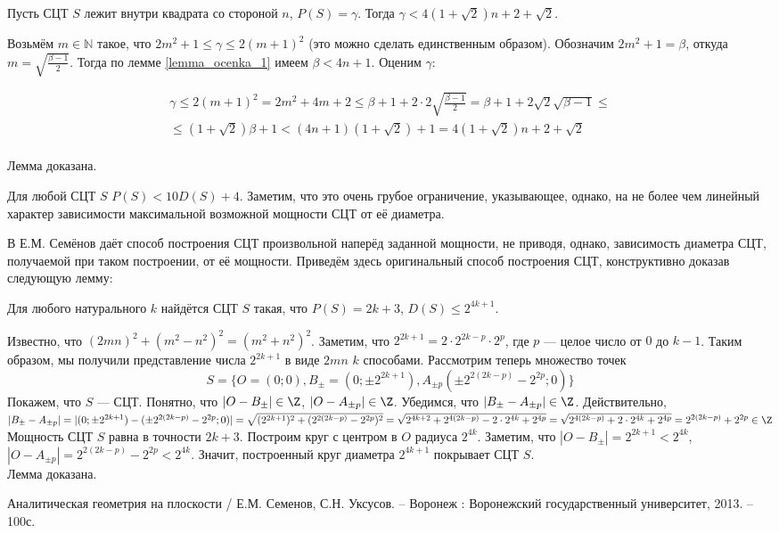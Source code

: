 \begin{lemma}
	Пусть СЦТ $S$ лежит внутри квадрата со стороной $n$, $P(S)=\gamma$.
	Тогда $\gamma<4(1+\sqrt{2})n+2+\sqrt{2}$.
\end{lemma}

\dokvo
	Возьмём $m \in \mathbb{N}$ такое, что $2m^2+1 \le \gamma \le 2(m+1)^2$ (это можно сделать единственным образом).
	Обозначим $2m^2+1=\beta$, откуда $m=\sqrt{\frac{\beta-1}{2}}$. Тогда по лемме \ref{lemma_ocenka_1} имеем $ \beta < 4n + 1$. Оценим $\gamma$:

	\begin{multline}
		\gamma \leq 2(m+1)^2 = 2m^2+4m +2 \leq
		\beta + 1 + 2 \cdot 2 \sqrt{\frac{\beta-1}{2}} =
		\beta + 1 +2\sqrt{2}\sqrt{\beta-1} \leq
		\\ \leq
		(1+\sqrt{2})\beta+1 <
		(4n+1)(1+\sqrt{2})+1 =
		4(1+\sqrt{2})n+2+\sqrt{2}
	\end{multline}
\\ Лемма доказана.

\begin{sledstvie}
	Для любой СЦТ $S$ $P(S) < 10 D(S)+4$.
	Заметим, что это очень грубое ограничение, указывающее, однако,
	на не более чем линейный характер зависимости максимальной возможной мощности СЦТ от её диаметра.
\end{sledstvie}

В \cite{angem1kurs} Е.М. Семёнов даёт способ построения СЦТ произвольной наперёд заданной мощности, не приводя, однако, зависимость диаметра СЦТ, получаемой при таком построении, от её мощности.
Приведём здесь оригинальный способ построения СЦТ, конструктивно доказав следующую лемму:

\begin{lemma}
	Для любого натурального $k$ найдётся СЦТ $S$ такая, что $P(S)=2k+3$, $D(S)\leq 2^{4k+1}$.
\end{lemma}

\dokvo
	Известно, что $(2mn)^2+(m^2-n^2)^2=(m^2+n^2)^2$.
	Заметим, что $2^{2k+1} = 2 \cdot 2^{2k-p} \cdot 2^p$, где $p$ --- целое число от $0$ до $k-1$.
	Таким образом, мы получили представление числа $2^{2k+1}$ в виде $2mn$ $k$ способами.
	Рассмотрим теперь множество точек
	$$
		S=\{O=(0;0),B_\pm=(0;\pm 2^{2k+1}),A_{\pm p}(\pm 2^{2(2k-p)}-2^{2p};0)\}
	$$
	Покажем, что $S$ --- СЦТ.
	Понятно, что $|O-B_\pm|\in\Z$, $|O-A_{\pm p}|\in\Z$.
	Убедимся, что $|B_\pm-A_{\pm p}|\in\Z$.
	Действительно, $|B_\pm-A_{\pm p}|=|(0;\pm 2^{2k+1}) - (\pm 2^{2(2k-p)}-2^{2p};0)| = \sqrt{(2^{2k+1})^2+(2^{2(2k-p)}-2^{2p})^2}=
	\sqrt{2^{4k+2}+2^{4(2k-p)}-2\cdot 2^{4k}+2^{4p}}=\sqrt{2^{4(2k-p)}+2\cdot 2^{4k}+2^{4p}}=2^{2(2k-p)}+2^{2p}\in\Z$
	Мощность СЦТ $S$ равна в точности $2k+3$.
	Построим круг с центром в $O$ радиуса $2^{4k}$.
	Заметим, что $|O-B_\pm|=2^{2k+1}<2^{4k}$, $|O-A_{\pm p}| = 2^{2(2k-p)}-2^{2p} < 2^{4k}$.
	Значит, построенный круг диаметра $2^{4k+1}$ покрывает СЦТ $S$.
\\ Лемма доказана.


\begin{thebibliography}{99}

 Аналитическая геометрия на плоскости / Е.М. Семенов, С.Н. Уксусов. – Воронеж : Воронежский государственный университет, 2013. – 100с.

\end{thebibliography}
